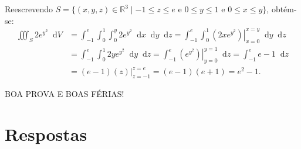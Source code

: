 \documentclass[12pt,a4paper]{article}
\newcommand*\diff{\mathop{}\!\mathrm{d}}
\begin{document}
\begin{ExerciseList}
Reescrevendo $S = \{(x, y, z) \in \mathbb{R}^3 \mid -1 \leq z \leq e \text{ e } 0 \leq y \leq 1 \text{ e } 0 \leq x \leq y \}$, obtém-se:
\begin{align*}
\iiint_{S} 2e^{y^2} \diff{V}
& = \int_{-1}^{e} \int_{0}^{1}\int_{0}^{y} 2e^{y^2} \diff{x}\diff{y}\diff{z}
  = \int_{-1}^{e} \int_{0}^{1} \left.\left(2xe^{y^2}\right)\right|_{x=0}^{x=y}\diff{y}\diff{z} \\
& = \int_{-1}^{e} \int_{0}^{1} 2ye^{y^2} \diff{y} \diff{z}
  = \int_{-1}^{e} \left.\left(e^{y^2}\right)\right|_{y=0}^{y=1} \diff{z}
  = \int_{-1}^{e} e - 1 \diff{z} \\
& = (e - 1)(z)\big|_{z=-1}^{z=e}
  = (e - 1)(e + 1)
  = e^2 - 1.
\end{align*}
\end{ExerciseList}

\vfill
\begin{center}
BOA PROVA E BOAS FÉRIAS!
\end{center}

\newpage
\restoregeometry
\section*{Respostas}
\shipoutAnswer
\end{document}
